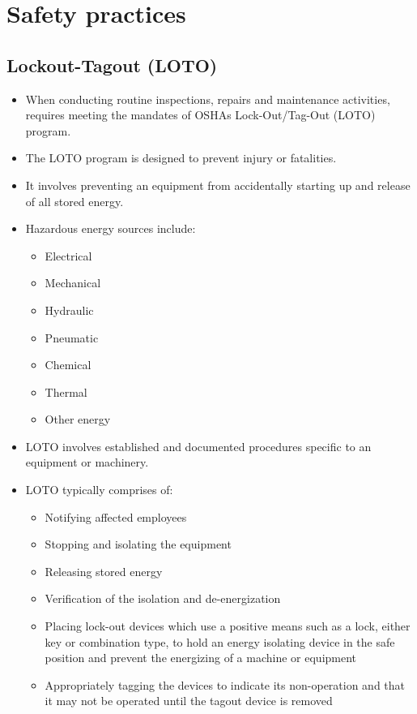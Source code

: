 \section{Safety practices}


\subsection{Lockout-Tagout (LOTO)}
\begin{itemize}
\item When conducting routine inspections, repairs and maintenance activities, requires meeting the mandates of OSHAs Lock-Out/Tag-Out (LOTO) program.
\item The LOTO program is designed to prevent injury or fatalities.  
\item It involves preventing an equipment from accidentally starting up and release of all stored energy. 
\item Hazardous energy  sources include: 
\begin{itemize}
\item Electrical 
\item Mechanical
\item Hydraulic
\item Pneumatic 
\item Chemical 
\item Thermal  
\item Other energy
\end{itemize}
\item LOTO involves established and documented procedures specific to an equipment or machinery.
\item LOTO typically comprises of:\\
\begin{itemize}
\item Notifying affected employees
\item Stopping and isolating the equipment
\item Releasing stored energy
\item Verification of the isolation and de-energization
\item Placing lock-out devices which use a positive means such as a lock, either key or combination type, to hold an energy isolating device in the safe position and prevent the energizing of a machine or equipment
\item Appropriately tagging the devices to indicate its non-operation and that it may not be operated until the tagout device is removed
\end{itemize}
\end{itemize}
